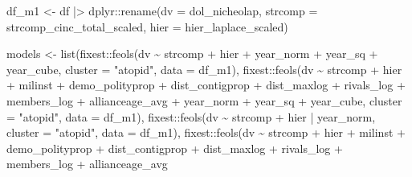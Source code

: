 \documentclass[
  12,
  letterpaper,
  DIV=11,
  numbers=noendperiod]{scrartcl}
\newenvironment{Shaded}{\begin{snugshade}}{\end{snugshade}}
\newcommand{\AttributeTok}[1]{\textcolor[rgb]{0.40,0.45,0.13}{#1}}
\newcommand{\FunctionTok}[1]{\textcolor[rgb]{0.28,0.35,0.67}{#1}}
\newcommand{\NormalTok}[1]{\textcolor[rgb]{0.00,0.23,0.31}{#1}}
\newcommand{\OtherTok}[1]{\textcolor[rgb]{0.00,0.23,0.31}{#1}}
\newcommand{\SpecialCharTok}[1]{\textcolor[rgb]{0.37,0.37,0.37}{#1}}
\newcommand{\StringTok}[1]{\textcolor[rgb]{0.13,0.47,0.30}{#1}}
\begin{document}
\begin{Shaded}
\begin{Highlighting}[numbers=left,,]
\NormalTok{df\_m1 }\OtherTok{\textless{}{-}}\NormalTok{ df }\SpecialCharTok{|\textgreater{}}
\NormalTok{  dplyr}\SpecialCharTok{::}\FunctionTok{rename}\NormalTok{(}\AttributeTok{dv =}\NormalTok{ dol\_nicheolap,}
                \AttributeTok{strcomp =}\NormalTok{ strcomp\_cinc\_total\_scaled,}
                \AttributeTok{hier =}\NormalTok{ hier\_laplace\_scaled)}

\NormalTok{models }\OtherTok{\textless{}{-}} \FunctionTok{list}\NormalTok{(fixest}\SpecialCharTok{::}\FunctionTok{feols}\NormalTok{(dv }\SpecialCharTok{\textasciitilde{}}\NormalTok{ strcomp }\SpecialCharTok{+}\NormalTok{ hier }\SpecialCharTok{+} 
\NormalTok{                               year\_norm }\SpecialCharTok{+}\NormalTok{ year\_sq }\SpecialCharTok{+}\NormalTok{ year\_cube, }
                             \AttributeTok{cluster =} \StringTok{"atopid"}\NormalTok{, }
                             \AttributeTok{data =}\NormalTok{ df\_m1),}
\NormalTok{               fixest}\SpecialCharTok{::}\FunctionTok{feols}\NormalTok{(dv }\SpecialCharTok{\textasciitilde{}}\NormalTok{ strcomp }\SpecialCharTok{+}\NormalTok{ hier }\SpecialCharTok{+}\NormalTok{ milinst }\SpecialCharTok{+}\NormalTok{ demo\_polityprop }\SpecialCharTok{+}\NormalTok{ dist\_contigprop }\SpecialCharTok{+}\NormalTok{ dist\_maxlog }\SpecialCharTok{+}\NormalTok{ rivals\_log }\SpecialCharTok{+}\NormalTok{ members\_log }\SpecialCharTok{+}\NormalTok{ allianceage\_avg }\SpecialCharTok{+} 
\NormalTok{                               year\_norm }\SpecialCharTok{+}\NormalTok{ year\_sq }\SpecialCharTok{+}\NormalTok{ year\_cube, }
                             \AttributeTok{cluster =} \StringTok{"atopid"}\NormalTok{, }
                             \AttributeTok{data =}\NormalTok{ df\_m1),}
\NormalTok{               fixest}\SpecialCharTok{::}\FunctionTok{feols}\NormalTok{(dv }\SpecialCharTok{\textasciitilde{}}\NormalTok{ strcomp }\SpecialCharTok{+}\NormalTok{ hier }
                             \SpecialCharTok{|}\NormalTok{ year\_norm, }
                             \AttributeTok{cluster =} \StringTok{"atopid"}\NormalTok{, }
                             \AttributeTok{data =}\NormalTok{ df\_m1),}
\NormalTok{               fixest}\SpecialCharTok{::}\FunctionTok{feols}\NormalTok{(dv }\SpecialCharTok{\textasciitilde{}}\NormalTok{ strcomp }\SpecialCharTok{+}\NormalTok{ hier }\SpecialCharTok{+}\NormalTok{ milinst }\SpecialCharTok{+}\NormalTok{ demo\_polityprop }\SpecialCharTok{+}\NormalTok{ dist\_contigprop }\SpecialCharTok{+}\NormalTok{ dist\_maxlog }\SpecialCharTok{+}\NormalTok{ rivals\_log }\SpecialCharTok{+}\NormalTok{ members\_log }\SpecialCharTok{+}\NormalTok{ allianceage\_avg }

\end{Highlighting}
\end{Shaded}
\end{document}
